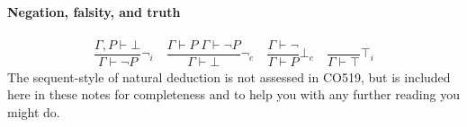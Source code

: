 \documentclass{article}
\theoremstyle{definition}
\begin{document}
\paragraph{Negation,  falsity, and truth}

\begin{align*}
  \dfrac{\Gamma, P \vdash \bot}{\Gamma \vdash \neg P} {\neg_i}
  \quad
  \dfrac{\Gamma \vdash P \; \Gamma \vdash \neg P}{\Gamma \vdash \bot} {\neg_e}
  \quad
  \dfrac{\Gamma \vdash \neg}{\Gamma \vdash P} {\bot_e}
  \quad
  \dfrac{}{\Gamma \vdash \top} {\top_i}
\end{align*}
%
The sequent-style of natural deduction is not assessed in CO519, but
is included here in these notes for completeness and to help you with
any further reading you might do.
\end{document}
